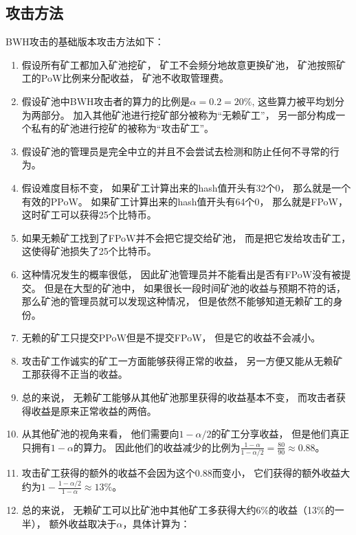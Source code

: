 \documentclass[a4paper, 11pt]{article}
\begin{document}
\begin{CJK*}{UTF8}{gbsn}
    \subsection{攻击方法}

    \indent

    BWH攻击的基础版本攻击方法如下：

    \begin{enumerate}
        \item 假设所有矿工都加入矿池挖矿，
        矿工不会频分地故意更换矿池，
        矿池按照矿工的PoW比例来分配收益，
        矿池不收取管理费。
        \item 假设矿池中BWH攻击者的算力的比例是$\alpha = 0.2 = 20\%$,
        这些算力被平均划分为两部分。
        加入其他矿池进行挖矿部分被称为“无赖矿工”，
        另一部分构成一个私有的矿池进行挖矿的被称为“攻击矿工”。
        \item 假设矿池的管理员是完全中立的并且不会尝试去检测和防止任何不寻常的行为。
        \item 假设难度目标不变，
        如果矿工计算出来的hash值开头有32个0，
        那么就是一个有效的PPoW。
        如果矿工计算出来的hash值开头有64个0，
        那么就是FPoW，
        这时矿工可以获得25个比特币。
        \item 如果无赖矿工找到了FPoW并不会把它提交给矿池，
        而是把它发给攻击矿工，
        这使得矿池损失了25个比特币。
        \item 这种情况发生的概率很低，
        因此矿池管理员并不能看出是否有FPoW没有被提交。
        但是在大型的矿池中，
        如果很长一段时间矿池的收益与预期不符的话，
        那么矿池的管理员就可以发现这种情况，
        但是依然不能够知道无赖矿工的身份。
        \item 无赖的矿工只提交PPoW但是不提交FPoW，
        但是它的收益不会减小。
        \item 攻击矿工作诚实的矿工一方面能够获得正常的收益，
        另一方便又能从无赖矿工那获得不正当的收益。
        \item 总的来说，
        无赖矿工能够从其他矿池那里获得的收益基本不变，
        而攻击者获得收益是原来正常收益的两倍。
        \item 从其他矿池的视角来看，
        他们需要向$1 - \alpha/2$的矿工分享收益，
        但是他们真正只拥有$1 - \alpha$的算力。
        因此他们的收益减少的比例为$\frac{1-\alpha}{1-\alpha/2} = \frac{80}{90} \approx 0.88$。
        \item 攻击矿工获得的额外的收益不会因为这个0.88而变小，
        它们获得的额外收益大约为$1 - \frac{1-\alpha/2}{1-\alpha} \approx 13\%$。
        \item 总的来说，
        无赖矿工可以比矿池中其他矿工多获得大约6\%的收益（13\%的一半），
        额外收益取决于$\alpha$，具体计算为：


\end{enumerate}
\end{CJK*}
\end{document}

